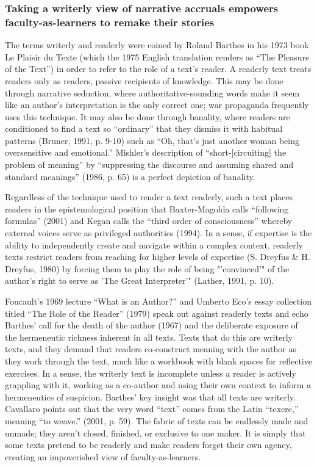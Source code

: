 \subsubsection{Taking a writerly view of narrative accruals empowers faculty-as-learners to remake their stories}

The terms writerly and readerly were coined by Roland Barthes in his 1973 book Le Plaisir du Texte (which the 1975 English translation renders as “The Pleasure of the Text”) in order to refer to the role of a text’s reader. A readerly text treats readers only as readers, passive recipients of knowledge. This may be done through narrative seduction, where authoritative-sounding words make it seem like an author’s interpretation is the only correct one; war propaganda frequently uses this technique. It may also be done through banality, where readers are conditioned to find a text so “ordinary” that they dismiss it with habitual patterns (Bruner, 1991, p. 9-10) such as “Oh, that’s just another woman being oversensitive and emotional.” Mishler’s description of “short-[circuiting] the problem of meaning” by “suppressing the discourse and assuming shared and standard meanings” (1986, p. 65) is a perfect depiction of banality. 

Regardless of the technique used to render a text readerly, such a text places readers in the epistemological position that Baxter-Magolda calls “following formulas” (2001) and Kegan calls the “third order of consciousness” whereby external voices serve as privileged authorities (1994). In a sense, if expertise is the ability to independently create and navigate within a complex context, readerly texts restrict readers from reaching for higher levels of expertise (S. Dreyfus & H. Dreyfus, 1980) by forcing them to play the role of being "'convinced'" of the author's right to serve as 'The Great Interpreter'" (Lather, 1991, p. 10).

Foucault’s 1969 lecture “What is an Author?” and Umberto Eco’s essay collection titled “The Role of the Reader” (1979) speak out against readerly texts and echo Barthes’ call for the death of the author (1967) and the deliberate exposure of the hermeneutic richness inherent in all texts. Texts that do this are writerly texts, and they demand that readers co-construct meaning with the author as they work through the text, much like a workbook with blank spaces for reflective exercises. In a sense, the writerly text is incomplete unless a reader is actively grappling with it, working as a co-author and using their own context to inform a hermeneutics of suspicion. Barthes’ key insight was that all texts are writerly. Cavallaro points out that the very word “text” comes from the Latin “texere,” meaning “to weave.” (2001, p. 59). The fabric of texts can be endlessly made and unmade; they aren't closed, finished, or exclusive to one maker. It is simply that some texts pretend to be readerly and make readers forget their own agency, creating an impoverished view of faculty-as-learners.

